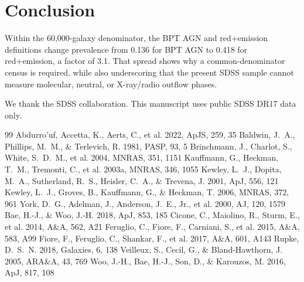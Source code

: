 \documentclass[twocolumn]{aastex631}
\begin{document}
\section{Conclusion}\label{sec:conclusion}
Within the 60,000-galaxy denominator, the BPT AGN and red+emission definitions change prevalence from 0.136 for BPT AGN to 0.418 for red+emission, a factor of 3.1. That spread shows why a common-denominator census is required, while also underscoring that the present SDSS sample cannot measure molecular, neutral, or X-ray/radio outflow phases.

\begin{acknowledgments}
We thank the SDSS collaboration. This manuscript uses public SDSS DR17 data only.
\end{acknowledgments}
\begin{thebibliography}{99}
 Abdurro'uf, Accetta, K., Aerts, C., et al. 2022, ApJS, 259, 35
 Baldwin, J.~A., Phillips, M.~M., \& Terlevich, R. 1981, PASP, 93, 5
 Brinchmann, J., Charlot, S., White, S.~D.~M., et al. 2004, MNRAS, 351, 1151
 Kauffmann, G., Heckman, T.~M., Tremonti, C., et al. 2003a, MNRAS, 346, 1055
 Kewley, L.~J., Dopita, M.~A., Sutherland, R.~S., Heisler, C.~A., \& Trevena, J. 2001, ApJ, 556, 121
 Kewley, L.~J., Groves, B., Kauffmann, G., \& Heckman, T. 2006, MNRAS, 372, 961
 York, D.~G., Adelman, J., Anderson, J.~E., Jr., et al. 2000, AJ, 120, 1579
 Bae, H.-J., \& Woo, J.-H. 2018, ApJ, 853, 185
 Cicone, C., Maiolino, R., Sturm, E., et al. 2014, A\&A, 562, A21
 Feruglio, C., Fiore, F., Carniani, S., et al. 2015, A\&A, 583, A99
 Fiore, F., Feruglio, C., Shankar, F., et al. 2017, A\&A, 601, A143
 Rupke, D.~S.~N. 2018, Galaxies, 6, 138
 Veilleux, S., Cecil, G., \& Bland-Hawthorn, J. 2005, ARA\&A, 43, 769
 Woo, J.-H., Bae, H.-J., Son, D., \& Karouzos, M. 2016, ApJ, 817, 108
\end{thebibliography}
\end{document}
